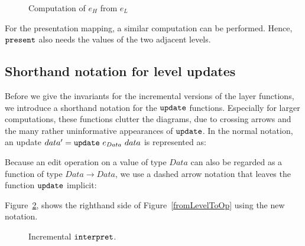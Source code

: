 \begin{figure}
\begin{small}
\begin{center}
\begin{center}
\end{center}\caption{Computation of $e_{H}$ from $e_{L}$}\label{computeOps} 
\end{center}
\end{small}
\end{figure}

For the presentation mapping, a similar computation can be performed. Hence, ${\tt present}$ also needs the values of the two adjacent levels. 


%																
\subsection{Shorthand notation for level updates}

Before we give the invariants for the incremental versions of the layer functions, we introduce a shorthand notation for the ${\tt update}$ functions. Especially for larger computations, these functions clutter the diagrams, due to crossing arrows and the many rather uninformative appearances of ${\tt update}$. In the normal notation, an update $data' = {\tt update}~e_{Data}~data$ is represented as:\\


\smallskip
Because an edit operation on a value of type $Data$ can also be regarded as a function of type 
$Data \rightarrow Data$, we use a dashed arrow notation that leaves the function ${\tt update}$ implicit:\\


Figure~\ref{incrementalInterpret}, shows the righthand side of Figure~\ref{fromLevelToOp} using the new notation.

\begin{figure}
\begin{small}
\begin{center}
\begin{center}
\end{center}\caption{Incremental ${\tt interpret}$.}\label{incrementalInterpret} 
\end{center}
\end{small}
\end{figure}


